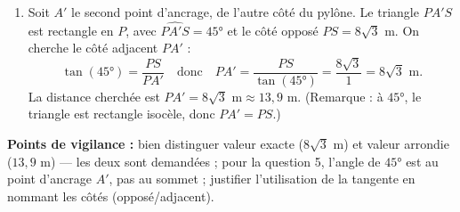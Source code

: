 \documentclass[11pt]{article}
\begin{document}
\begin{corrige}
\begin{enumerate}
\item Soit $A'$ le second point d'ancrage, de l'autre côté du pylône. Le triangle $PA'S$ est rectangle en $P$, avec $\widehat{PA'S} = 45°$ et le côté opposé $PS = 8\sqrt{3}$ m. On cherche le côté adjacent $PA'$ :
\[ \tan(45°) = \dfrac{PS}{PA'} \quad \text{donc} \quad PA' = \dfrac{PS}{\tan(45°)} = \dfrac{8\sqrt{3}}{1} = 8\sqrt{3} \text{ m}. \]
La distance cherchée est $\boxed{PA' = 8\sqrt{3} \text{ m} \approx 13,9 \text{ m}}$. (Remarque : à $45°$, le triangle est rectangle isocèle, donc $PA' = PS$.)
\end{enumerate}
\textbf{Points de vigilance :} bien distinguer valeur exacte ($8\sqrt{3}$ m) et valeur arrondie ($13,9$ m) — les deux sont demandées ; pour la question 5, l'angle de $45°$ est au point d'ancrage $A'$, pas au sommet ; justifier l'utilisation de la tangente en nommant les côtés (opposé/adjacent).
\end{corrige}
\end{document}
